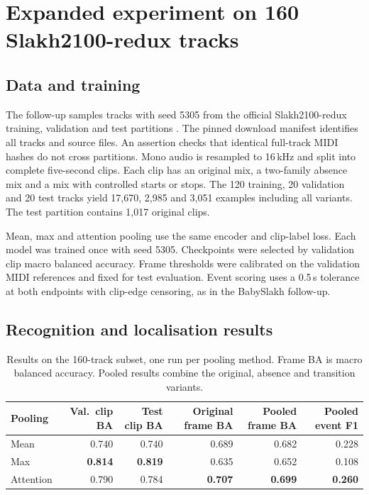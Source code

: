 \section{Expanded experiment on 160 Slakh2100-redux tracks}
\label{sec:slakh160}

\subsection{Data and training}
The follow-up samples tracks with seed 5305 from the official Slakh2100-redux training, validation and test partitions \cite{slakhredux}. The pinned download manifest identifies all tracks and source files. An assertion checks that identical full-track MIDI hashes do not cross partitions. Mono audio is resampled to 16\,kHz and split into complete five-second clips. Each clip has an original mix, a two-family absence mix and a mix with controlled starts or stops. The 120 training, 20 validation and 20 test tracks yield 17,670, 2,985 and 3,051 examples including all variants. The test partition contains 1,017 original clips.

Mean, max and attention pooling use the same encoder and clip-label loss. Each model was trained once with seed 5305. Checkpoints were selected by validation clip macro balanced accuracy. Frame thresholds were calibrated on the validation MIDI references and fixed for test evaluation. Event scoring uses a 0.5\,s tolerance at both endpoints with clip-edge censoring, as in the BabySlakh follow-up.

\subsection{Recognition and localisation results}
\begin{table}[htbp]
\centering
\small
\caption{Results on the 160-track subset, one run per pooling method. Frame BA is macro balanced accuracy. Pooled results combine the original, absence and transition variants.}
\label{tab:slakh160}
\begin{tabular}{lrrrrr}
\toprule
Pooling & Val.\ clip BA & Test clip BA & Original frame BA & Pooled frame BA & Pooled event F1\\
\midrule
Mean & 0.740 & 0.740 & 0.689 & 0.682 & 0.228\\
Max & \textbf{0.814} & \textbf{0.819} & 0.635 & 0.652 & 0.108\\
Attention & 0.790 & 0.784 & \textbf{0.707} & \textbf{0.699} & \textbf{0.260}\\
\bottomrule
\end{tabular}
\end{table}

